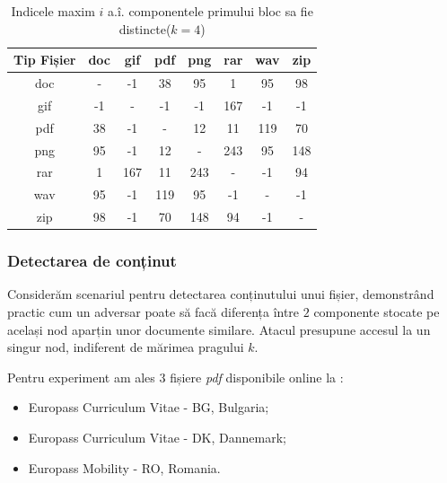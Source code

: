 \documentclass[oneside, 12pt]{book}
\begin{document}
\begin{table}[h]
\begin{center}
\caption{Indicele maxim $i$ a.î. componentele primului bloc sa fie distincte($k=4$)}\label{tb:margins}
\label{table:k4}
\begin{tabular}{cccccccc}
Tip Fișier & doc & gif & pdf & png & rar & wav & zip \\\hline
  doc & - & -1 & 38 & 95 & 1 & 95 & 98\\
  gif & -1 & - & -1 & -1 & 167 & -1 & -1\\
  pdf & 38 & -1 & - & 12 & 11 & 119 & 70\\
  png & 95 & -1 & 12 & - & 243 & 95 & 148\\
  rar & 1 & 167 & 11 & 243 & - & -1 & 94\\
  wav & 95 & -1 & 119 & 95 & -1 & - & -1\\
  zip & 98 & -1 & 70 & 148 & 94 & -1 & -\\ \hline
\end{tabular}
\end{center}
\bigskip
\end{table}

\clearpage

\subsubsection{Detectarea de conținut}

Considerăm scenariul pentru detectarea conținutului unui fișier, demonstrând practic cum un adversar poate să facă diferența între $2$ componente stocate pe același nod aparțin unor documente similare. Atacul presupune accesul la un singur nod, indiferent de mărimea pragului $k$.


Pentru experiment am ales $3$ fișiere \textit{pdf} disponibile online la {\cite{Europass:2015}}:
\begin{itemize}
  \item Europass Curriculum Vitae - BG, Bulgaria;
  \item Europass Curriculum Vitae - DK, Dannemark;
  \item Europass Mobility - RO, Romania.
\end{itemize}

\end{document}
